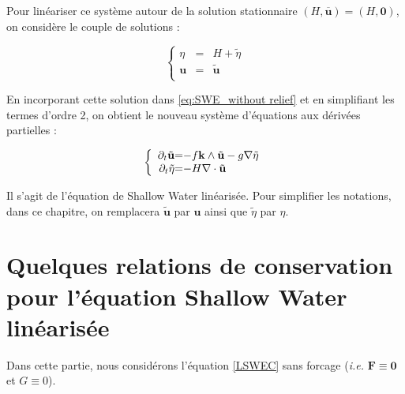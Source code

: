 Pour linéariser ce système autour de la solution stationnaire $(H, \overline{\mathbf{u}}) = (H,\mathbf{0})$, on considère le couple de solutions :

\begin{equation}
\left\lbrace
\begin{array}{rcl}
\eta & = & H + \tilde{\eta} \\
\mathbf{u} & = & \tilde{\mathbf{u}} \\
\end{array}
\right.
\end{equation}

En incorporant cette solution dans \eqref{eq:SWE_without relief} et en simplifiant les termes d'ordre 2, on obtient le nouveau système d'équations aux dérivées partielles :

\begin{equation}
\left\lbrace
\begin{array}{r @{=} l}
\partial_t \tilde{\mathbf{u}}& -f \mathbf{k} \wedge \tilde{\mathbf{u}} - g \nabla \tilde{\eta}\\
\partial_t \tilde{\eta} & -H \nabla \cdot \tilde{\mathbf{u}}
\end{array}
\right.
\end{equation}

Il s'agit de l'équation de Shallow Water linéarisée.
Pour simplifier les notations, dans ce chapitre, on remplacera $\tilde{\mathbf{u}}$ par $\mathbf{u}$ ainsi que $\tilde{\eta}$ par $\eta$.





\section{Quelques relations de conservation pour l'équation Shallow Water linéarisée}

Dans cette partie, nous considérons l'équation \eqref{LSWEC} sans forcage (\textit{i.e.} $\mathbf{F} \equiv \mathbf{0}$ et $G \equiv 0$).

